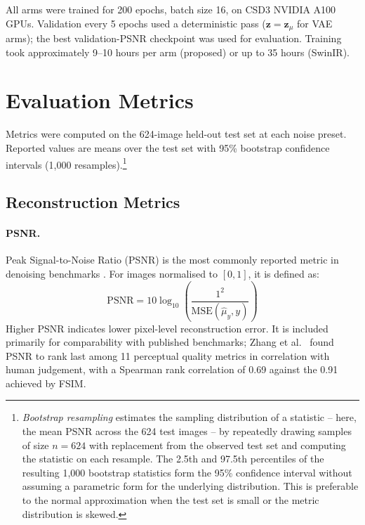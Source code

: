 \documentclass[12pt, a4paper, twoside, openright]{book}
\begin{document}
All arms were trained for 200 epochs, batch size 16, on CSD3 NVIDIA A100 GPUs. Validation every 5 epochs used a deterministic pass ($\mathbf{z}=\mathbf{z}_\mu$ for VAE arms); the best validation-PSNR checkpoint was used for evaluation. Training took approximately 9--10 hours per arm (proposed) or up to 35 hours (SwinIR).

\section{Evaluation Metrics}
\label{sec:methods:evaluation}

Metrics were computed on the 624-image held-out test set at each noise preset. Reported values are means over the test set with 95\% bootstrap confidence intervals (1,000 resamples).\footnote{\emph{Bootstrap resampling} \cite{efron_bootstrap_1979} estimates the sampling distribution of a statistic -- here, the mean PSNR across the 624 test images -- by repeatedly drawing samples of size $n=624$ with replacement from the observed test set and computing the statistic on each resample. The 2.5th and 97.5th percentiles of the resulting 1,000 bootstrap statistics form the 95\% confidence interval without assuming a parametric form for the underlying distribution. This is preferable to the normal approximation when the test set is small or the metric distribution is skewed.}

\subsection{Reconstruction Metrics}
\label{sec:methods:evaluation:recon}

\paragraph{PSNR.}
Peak Signal-to-Noise Ratio (PSNR) is the most commonly reported metric in denoising
benchmarks \cite{zhang_beyond_2017, liang_swinir_2021}. For images normalised to
$[0,1]$, it is defined as:
\begin{equation}
\label{eq:methods:psnr}
\mathrm{PSNR} = 10\log_{10}\!\left(\frac{1^2}{\mathrm{MSE}(\hat{\mu}_y, y)}\right)
\end{equation}
Higher PSNR indicates lower pixel-level reconstruction error. It is included primarily for
comparability with published benchmarks; Zhang et al.\ \cite{zhang_comprehensive_2012}
found PSNR to rank last among 11 perceptual quality metrics in correlation with human
judgement, with a Spearman rank correlation of 0.69 against the 0.91 achieved by FSIM.
\end{document}
